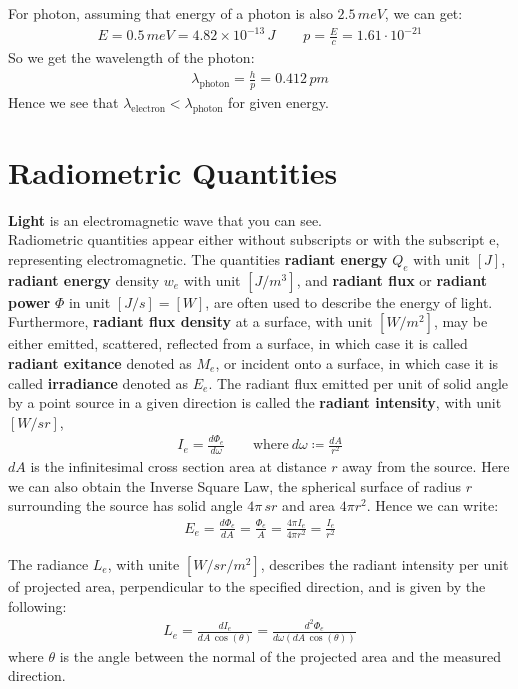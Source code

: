 \documentclass[11pt]{book}
\theoremstyle{break}
\theoremstyle{break}
\begin{document}
For photon, assuming that energy of a photon is also $2.5 \, meV$, we can get:
\begin{align*}
E = 0.5\, meV = 4.82\times 10^{-13}\, J \qquad p = \frac{E}{c} = 1.61\cdot 10^{-21}  
\end{align*}
So we get the wavelength of the photon:
\begin{align*}
\lambda_{\text{photon}}= \frac{h}{p} = 0.412\, pm
\end{align*}
Hence we see that $\lambda_{\text{electron}} < \lambda_{\text{photon}}$ for given energy.
\hfill\break

\newpage
\section[Radiometric Quantities]{\color{red}Radiometric Quantities\color{black}}
\textbf{Light} is an electromagnetic wave that you can see. \\

Radiometric quantities appear either without subscripts or with the subscript e, representing electromagnetic. The quantities \textbf{radiant energy} $Q_e$ with unit $[J]$, \textbf{radiant energy} density $w_e$ with unit $[J/m^3]$, and \textbf{radiant flux} or \textbf{radiant power} $\Phi$ in unit $[J/s] = [W]$, are often used to describe the energy of light. \\

Furthermore, \textbf{radiant flux density} at a surface, with unit $[W/m^2]$, may be either emitted, scattered, reflected from a surface, in which case it is called \textbf{radiant exitance} denoted as $M_e$, or incident onto a surface, in which case it is called \textbf{irradiance} denoted as $E_e$. The radiant flux emitted per unit of solid angle by a point source in a given direction is called the \textbf{radiant intensity}, with unit $[W/sr]$,
\begin{align}
I_e = \frac{d\Phi_e}{d\omega} \qquad \text{where}\ d\omega \coloneqq \frac{dA}{r^2}
\end{align}
$dA$ is the infinitesimal cross section area at distance $r$ away from the source. Here we can also obtain the Inverse Square Law, the spherical surface of radius $r$ surrounding the source has solid angle $4\pi \, sr$ and area $4\pi r^2$. Hence we can write:
\begin{align}
E_e = \frac{d\Phi_e}{dA} = \frac{\Phi_e}{A} = \frac{4\pi I_e}{4\pi r^2} = \frac{I_e}{r^2}
\end{align}

The radiance $L_e$, with unite $[W/sr/m^2]$, describes the radiant intensity per unit of projected area, perpendicular to the specified direction, and is given by the following:
\begin{align}
L_e = \frac{dI_e}{dA \, \cos(\theta)} = \frac{d^2 \Phi_e}{d\omega (dA \, \cos(\theta))}
\end{align}
where $\theta$ is the angle between the normal of the projected area and the measured direction. \\
\end{document}
